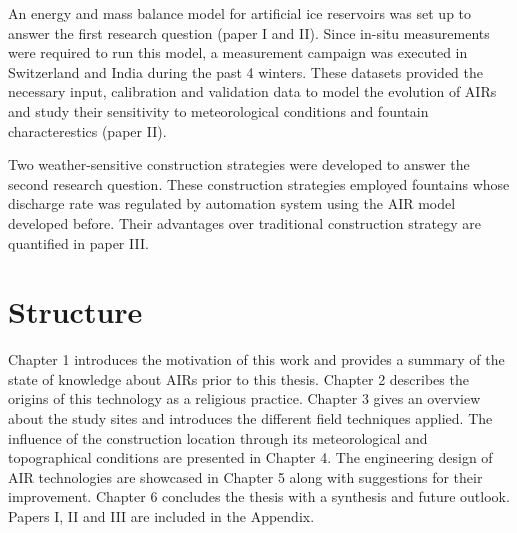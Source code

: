 An energy and mass balance model for artificial ice reservoirs was set up to answer the first research question
(paper I and II). Since in-situ measurements were required to run this model, a measurement campaign was
executed in Switzerland and India during the past 4 winters. These datasets provided the necessary input,
calibration and validation data to model the evolution of AIRs and study their sensitivity to meteorological
conditions and fountain characterestics (paper II). 

Two weather-sensitive construction strategies were developed to answer the second research question. These
construction strategies employed fountains whose discharge rate was regulated by automation system using the AIR
model developed before. Their advantages over traditional construction strategy are quantified in paper III.

\section{Structure}

Chapter 1 introduces the motivation of this work and provides a summary of the state of knowledge about AIRs
prior to this thesis. Chapter 2 describes the origins of this technology as a religious practice. Chapter 3
gives an overview about the study sites and introduces the different field techniques applied. The influence of
the construction location through its meteorological and topographical conditions are presented in Chapter 4.
The engineering design of AIR technologies are showcased in Chapter 5 along with suggestions for their
improvement. Chapter 6 concludes the thesis with a synthesis and future outlook. Papers I, II and III are
included in the Appendix.


